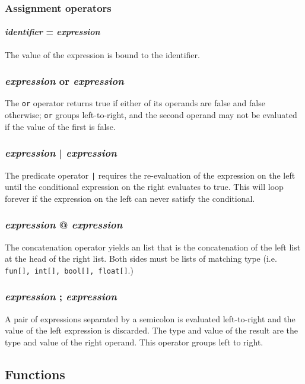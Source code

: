 \subsubsection{Assignment operators}
\paragraph{\textit{identifier} = \textit{expression}}
The value of the expression is bound to the identifier.

\subsubsection{\textit{expression} or \textit{expression}}
The \texttt{or} operator returns true if either of its operands are false and false otherwise; \texttt{or} groups left-to-right, and the second operand may not be evaluated if the value of the first is false.

\subsubsection{\textit{expression} | \textit{expression}}
The predicate operator \texttt{|} requires the re-evaluation of the expression on the left until the conditional expression on the right evaluates to true. This will loop forever if the expression on the left can never satisfy the conditional.

\subsubsection{\textit{expression} @ \textit{expression}} 
The concatenation operator yields an list that is the concatenation of the left list at the head of the right list. Both sides must be lists of matching type (i.e. \texttt{fun[], int[], bool[], float[]}.) 

\subsubsection{\textit{expression} ; \textit{expression}}
A pair of expressions separated by a semicolon is evaluated left-to-right and the value of the left expression is discarded. The type and value of the result are the type and value of the right operand. This operator groups left to right. 
 
\subsection{Functions}

